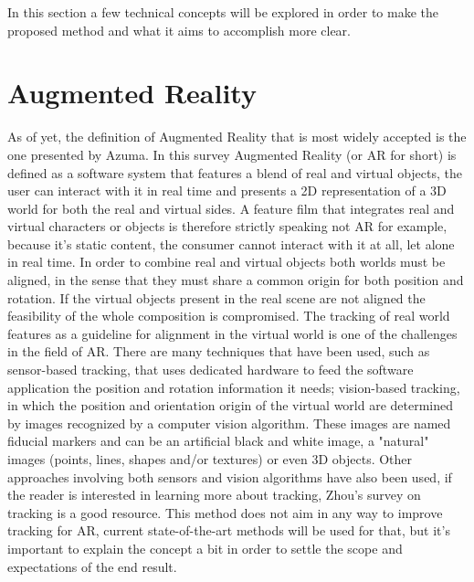 
In this section a few technical concepts will be explored in order to make the proposed method and what it aims to accomplish more clear.

\section{Augmented Reality}
As of yet, the definition of Augmented Reality that is most widely accepted is the one presented by Azuma\cite{azuma1997}. In this survey Augmented Reality (or AR for short) is defined as a software system that features a blend of real and virtual objects, the user can interact with it in real time and presents a 2D representation of a 3D world for both the real and virtual sides. A feature film that integrates real and virtual characters or objects is therefore strictly speaking not AR for example, because it's static content, the consumer cannot interact with it at all, let alone in real time.
In order to combine real and virtual objects both worlds must be aligned, in the sense that they must share a common origin for both position and rotation. If the virtual objects present in the real scene are not aligned the feasibility of the whole composition is compromised. The tracking of real world features as a guideline for alignment in the virtual world is one of the challenges in the field of AR. There are many techniques that have been used, such as sensor-based tracking, that uses dedicated hardware to feed the software application the position and rotation information it needs; vision-based tracking, in which the position and orientation origin of the virtual world are determined by images recognized by a computer vision algorithm. These images are named fiducial markers and can be an artificial black and white image, a "natural" images (points, lines, shapes and/or textures) or even 3D objects. Other approaches involving both sensors and vision algorithms have also been used, if the reader is interested in learning more about tracking, Zhou's survey\cite{zhou2008} on tracking is a good resource.
This method does not aim in any way to improve tracking for AR, current state-of-the-art methods will be used for that, but it's important to explain the concept a bit in order to settle the scope and expectations of the end result.

